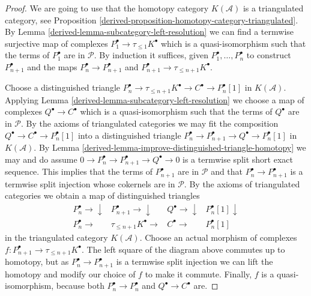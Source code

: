 \begin{proof}

We are going to use that the homotopy category $K(\mathcal{A})$ is a
triangulated category, see Proposition
\ref{derived-proposition-homotopy-category-triangulated}.
By Lemma \ref{derived-lemma-subcategory-left-resolution} we can find a
termwise surjective map of complexes $P_1^\bullet \to \tau_{\leq 1}K^\bullet$
which is a quasi-isomorphism
such that the terms of $P_1^\bullet$ are in $\mathcal{P}$.
By induction it suffices, given
$P_1^\bullet, \ldots, P_n^\bullet$ to construct
$P_{n + 1}^\bullet$ and the maps
$P_n^\bullet \to P_{n + 1}^\bullet$ and
$P_{n + 1}^\bullet \to \tau_{\leq n + 1}K^\bullet$.

\medskip\noindent
Choose a distinguished triangle
$P_n^\bullet \to \tau_{\leq n + 1}K^\bullet \to C^\bullet \to P_n^\bullet[1]$
in $K(\mathcal{A})$. Applying
Lemma \ref{derived-lemma-subcategory-left-resolution} we choose a
map of complexes $Q^\bullet \to C^\bullet$
which is a quasi-isomorphism such that the terms of $Q^\bullet$
are in $\mathcal{P}$. By the axioms of triangulated categories
we may fit the composition $Q^\bullet \to C^\bullet \to P_n^\bullet[1]$ into
a distinguished triangle
$P_n^\bullet \to P_{n + 1}^\bullet \to Q^\bullet \to P_n^\bullet[1]$
in $K(\mathcal{A})$.
By Lemma \ref{derived-lemma-improve-distinguished-triangle-homotopy}
we may and do assume
$0 \to P_n^\bullet \to P_{n + 1}^\bullet \to Q^\bullet \to 0$
is a termwise split short exact sequence. This implies that
the terms of $P_{n + 1}^\bullet$ are in $\mathcal{P}$ and that
$P_n^\bullet \to P_{n + 1}^\bullet$ is a termwise split injection
whose cokernels are in $\mathcal{P}$.
By the axioms of triangulated categories we obtain a map
of distinguished triangles
$$
\begin{array}{cccc}P_n^\bullet \longrightarrow\downarrow & P_{n + 1}^\bullet \longrightarrow\downarrow & Q^\bullet \longrightarrow\downarrow & P_n^\bullet[1] \downarrow \\ P_n^\bullet \longrightarrow & \tau_{\leq n + 1}K^\bullet \longrightarrow & C^\bullet \longrightarrow & P_n^\bullet[1]\end{array}
$$
in the triangulated category $K(\mathcal{A})$. Choose an actual morphism of
complexes $f : P_{n + 1}^\bullet \to \tau_{\leq n + 1}K^\bullet$.
The left square of the diagram above commutes up to homotopy, but as
$P_n^\bullet \to P_{n + 1}^\bullet$ is a termwise split injection
we can lift the homotopy and modify our choice of $f$ to make it commute.
Finally, $f$ is a quasi-isomorphism, because both $P_n^\bullet \to P_n^\bullet$
and $Q^\bullet \to C^\bullet$ are.


\end{proof}
